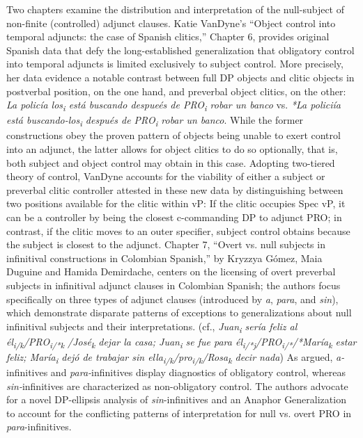\documentclass[output=paper,draftmode]{langscibook}
\begin{document}
Two chapters examine the distribution and interpretation of the null-subject of non-finite (controlled) adjunct clauses. Katie VanDyne’s “Object control into temporal adjuncts: the case of Spanish clitics,” Chapter 6, provides original Spanish data that defy the long-established generalization that obligatory control into temporal adjuncts is limited exclusively to subject control. More precisely, her data evidence a notable contrast between full DP objects and clitic objects in postverbal position, on the one hand, and preverbal object clitics, on the other: \textit{La policía los\textsubscript{i} está buscando despueés de PRO\textsubscript{i} robar un banco} vs.  \textit{*La policiía está buscando-los\textsubscript{i} después de PRO\textsubscript{i} robar un banco}. While the former constructions obey the proven pattern of objects being unable to exert control into an adjunct, the latter allows for object clitics to do so optionally, that is, both subject and object control may obtain in this case. Adopting  two-tiered theory of control, VanDyne accounts for the viability of either a subject or preverbal clitic controller attested in these new data by distinguishing between two positions available for the clitic within vP: If the clitic occupies Spec vP, it can be a controller by being the closest c-commanding DP to adjunct PRO; in contrast, if the clitic moves to an outer specifier, subject control obtains because the subject is closest to the adjunct. Chapter 7, “Overt vs. null subjects in infinitival constructions in Colombian Spanish,” by Kryzzya Gómez, Maia Duguine and Hamida Demirdache, centers on the licensing of overt preverbal subjects in infinitival adjunct clauses in Colombian Spanish; the authors focus specifically on three types of adjunct clauses (introduced by \textit{a}, \textit{para}, and \textit{sin}), which demonstrate disparate patterns of exceptions to generalizations about null infinitival subjects and their interpretations. (cf., \textit{Juan\textsubscript{i} sería feliz al él\textsubscript{i/k}/PRO\textsubscript{i/*k} /José\textsubscript{k} dejar la casa; Juan\textsubscript{i} se fue para él\textsubscript{i/*j}/PRO\textsubscript{i/*}/*María\textsubscript{k} estar feliz; María\textsubscript{i} dejó de trabajar sin ella\textsubscript{i/k}/pro\textsubscript{i/k}/Rosa\textsubscript{k} decir nada}) As argued, \textit{a-}infinitives and \textit{para-}infinitives display diagnostics of obligatory control, whereas \textit{sin-}infinitives are characterized as non-obligatory control. The authors advocate for a novel DP-ellipsis analysis of \textit{sin}-infinitives and an Anaphor Generalization to account for the conflicting patterns of interpretation for null vs. overt PRO in \textit{para}-infinitives.
\end{document}

